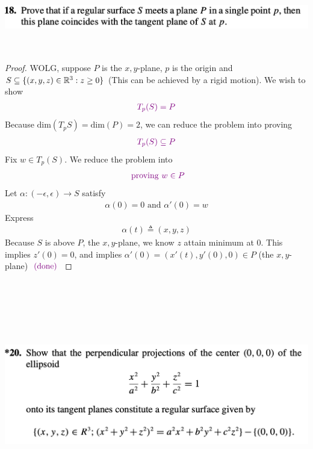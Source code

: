 \documentclass{report}
\begin{document}
\begin{question}{}{}
\includegraphics[height=3cm,width=18cm]{hw4q6}
\end{question}
\begin{proof}
WOLG, suppose $P$ is the  $x,y$-plane, $p$ is the origin and $S\subseteq \{ (x,y,z)\in\mathbb{R}^3: z\geq 0 \}$ (This can be achieved by a rigid motion). We wish to show 
\begin{align*}
  \textcolor{violet}{T_p(S)=P}
\end{align*}
Because  $\text{dim}(T_pS)=\text{dim}(P)=2$, we can reduce the problem into proving 
\begin{align*}
  \textcolor{violet}{T_p(S)\subseteq P}
\end{align*}
Fix $w \in T_p(S)$. We reduce the problem into 
\begin{align*}
\textcolor{violet}{\text{ proving }w\in P}
\end{align*} 
Let $\alpha:(-\epsilon ,\epsilon )\rightarrow S$ satisfy 
\begin{align*}
\alpha (0)=0\text{ and }\alpha '(0)=w
\end{align*}
Express 
\begin{align*}
\alpha (t)\triangleq (x,y,z)
\end{align*}
Because $S$ is above $P$, the $x,y$-plane, we know  $z$ attain minimum at $0$. This implies $z'(0)=0$, and implies $\alpha '(0)=(x'(t),y'(0),0)\in P$ (the $x,y$-plane) $\textcolor{violet}{\text{ (done) }}$
\end{proof}
\begin{question}{}{}
\includegraphics[height=10cm,width=18cm]{hwextra}
\end{question}
\end{document}
